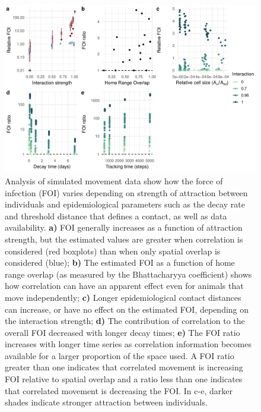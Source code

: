 \documentclass[letterpaper]{article}
\begin{document}
\begin{figure}
    \includegraphics[width=\textwidth]{figures/sim_results.pdf}
    \caption{Analysis of simulated movement data show how the force of infection (FOI) varies depending on strength of attraction between individuals and epidemiological parameters such as the decay rate and threshold distance that defines a contact, as well as data availability.  \textbf{a)} FOI generally increases as a function of attraction strength, but the estimated values are greater when correlation is considered (red boxplots) than when only spatial overlap is considered (blue);  \textbf{b)} The estimated FOI as a function of home range overlap (as measured by the Bhattacharyya coefficient) shows how correlation can have an apparent effect even for animals that move independently;   \textbf{c)} Longer epidemiological contact distances can increase, or have no effect on the estimated FOI, depending on the interaction strength; \textbf{d)} The contribution of correlation to the overall FOI decreased with longer decay times; \textbf{e)} The FOI ratio increases with longer time series as correlation information becomes available for a larger proportion of the space used. A FOI ratio greater than one indicates that correlated movement is increasing FOI relative to spatial overlap and a ratio less than one indicates that correlated movement is decreasing the FOI. In c-e, darker shades indicate stronger attraction between individuals. }
	\label{fig:simresults}
\end{figure}
\end{document}
